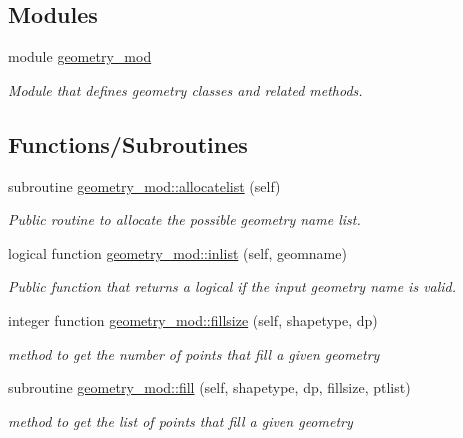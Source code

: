 \subsection*{Modules}
\begin{DoxyCompactItemize}
\item 
module \mbox{\hyperlink{namespacegeometry__mod}{geometry\+\_\+mod}}
\begin{DoxyCompactList}\small\item\em Module that defines geometry classes and related methods. \end{DoxyCompactList}\end{DoxyCompactItemize}
\subsection*{Functions/\+Subroutines}
\begin{DoxyCompactItemize}
\item 
subroutine \mbox{\hyperlink{namespacegeometry__mod_a1b6f259b0b6be71e02ffae7670f7d8ba}{geometry\+\_\+mod\+::allocatelist}} (self)
\begin{DoxyCompactList}\small\item\em Public routine to allocate the possible geometry name list. \end{DoxyCompactList}\item 
logical function \mbox{\hyperlink{namespacegeometry__mod_a22dd77024fce56da299445a697256155}{geometry\+\_\+mod\+::inlist}} (self, geomname)
\begin{DoxyCompactList}\small\item\em Public function that returns a logical if the input geometry name is valid. \end{DoxyCompactList}\item 
integer function \mbox{\hyperlink{namespacegeometry__mod_ad790edd694561b33dad20cfa3a14e8f2}{geometry\+\_\+mod\+::fillsize}} (self, shapetype, dp)
\begin{DoxyCompactList}\small\item\em method to get the number of points that fill a given geometry \end{DoxyCompactList}\item 
subroutine \mbox{\hyperlink{namespacegeometry__mod_a1d97564e04562532b5389bfb91aa676b}{geometry\+\_\+mod\+::fill}} (self, shapetype, dp, fillsize, ptlist)
\begin{DoxyCompactList}\small\item\em method to get the list of points that fill a given geometry \end{DoxyCompactList}\item 

\end{DoxyCompactItemize}
